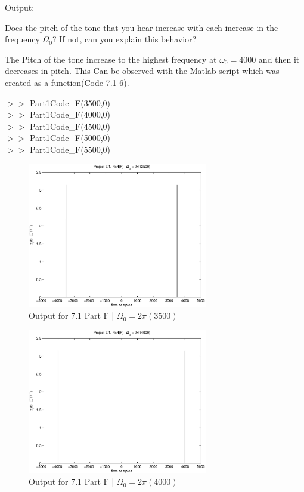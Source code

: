 {\LARGE Output:}

Does the pitch of the tone that you hear increase with each increase in the frequency $\Omega_0$? If not, can you explain this behavior?

The Pitch of the tone increase to the highest frequency at $\omega_0 = 4000$ and then it decreases in pitch. This Can be observed with the Matlab script which was created as a function(Code 7.1-6). 

$>>$ Part1Code\_F(3500,0)\\
$>>$ Part1Code\_F(4000,0)\\
$>>$ Part1Code\_F(4500,0)\\
$>>$ Part1Code\_F(5000,0)\\
$>>$ Part1Code\_F(5500,0)


\begin{figure}[!htbp]
  \centering
    \includegraphics[width=0.7\textwidth]{Part1/Output/Figures/proj71PartF-3500.eps}
  \caption{Output for 7.1 Part F | $\Omega_0 = 2\pi(3500)$ }
\end{figure}

\begin{figure}[!htbp]
  \centering
    \includegraphics[width=0.7\textwidth]{Part1/Output/Figures/proj71PartF-4000.eps}
  \caption{Output for 7.1 Part F | $\Omega_0 = 2\pi(4000)$ }
\end{figure}

